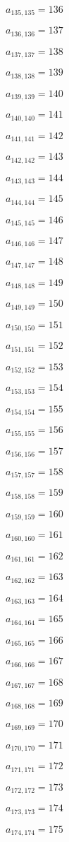 \documentclass[a4paper,12pt]{article}
\begin{document}
$a _{ 135, 135 } = 136$

$a _{ 136, 136 } = 137$

$a _{ 137, 137 } = 138$

$a _{ 138, 138 } = 139$

$a _{ 139, 139 } = 140$

$a _{ 140, 140 } = 141$

$a _{ 141, 141 } = 142$

$a _{ 142, 142 } = 143$

$a _{ 143, 143 } = 144$

$a _{ 144, 144 } = 145$

$a _{ 145, 145 } = 146$

$a _{ 146, 146 } = 147$

$a _{ 147, 147 } = 148$

$a _{ 148, 148 } = 149$

$a _{ 149, 149 } = 150$

$a _{ 150, 150 } = 151$

$a _{ 151, 151 } = 152$

$a _{ 152, 152 } = 153$

$a _{ 153, 153 } = 154$

$a _{ 154, 154 } = 155$

$a _{ 155, 155 } = 156$

$a _{ 156, 156 } = 157$

$a _{ 157, 157 } = 158$

$a _{ 158, 158 } = 159$

$a _{ 159, 159 } = 160$

$a _{ 160, 160 } = 161$

$a _{ 161, 161 } = 162$

$a _{ 162, 162 } = 163$

$a _{ 163, 163 } = 164$

$a _{ 164, 164 } = 165$

$a _{ 165, 165 } = 166$

$a _{ 166, 166 } = 167$

$a _{ 167, 167 } = 168$

$a _{ 168, 168 } = 169$

$a _{ 169, 169 } = 170$

$a _{ 170, 170 } = 171$

$a _{ 171, 171 } = 172$

$a _{ 172, 172 } = 173$

$a _{ 173, 173 } = 174$

$a _{ 174, 174 } = 175$
\end{document}
